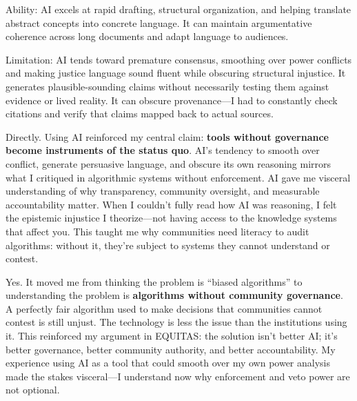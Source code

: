 \documentclass[12pt,a4paper]{article}
\begin{document}
Ability: AI excels at rapid drafting, structural organization, and helping translate abstract concepts into concrete language. It can maintain argumentative coherence across long documents and adapt language to audiences.

Limitation: AI tends toward premature consensus, smoothing over power conflicts and making justice language sound fluent while obscuring structural injustice. It generates plausible-sounding claims without necessarily testing them against evidence or lived reality. It can obscure provenance—I had to constantly check citations and verify that claims mapped back to actual sources.

Directly. Using AI reinforced my central claim: \textbf{tools without governance become instruments of the status quo}. AI's tendency to smooth over conflict, generate persuasive language, and obscure its own reasoning mirrors what I critiqued in algorithmic systems without enforcement. AI gave me visceral understanding of why transparency, community oversight, and measurable accountability matter. When I couldn't fully read how AI was reasoning, I felt the epistemic injustice I theorize—not having access to the knowledge systems that affect you. This taught me why communities need literacy to audit algorithms: without it, they're subject to systems they cannot understand or contest.

Yes. It moved me from thinking the problem is ``biased algorithms'' to understanding the problem is \textbf{algorithms without community governance}. A perfectly fair algorithm used to make decisions that communities cannot contest is still unjust. The technology is less the issue than the institutions using it. This reinforced my argument in EQUITAS: the solution isn't better AI; it's better governance, better community authority, and better accountability. My experience using AI as a tool that could smooth over my own power analysis made the stakes visceral—I understand now why enforcement and veto power are not optional.
\end{document}
